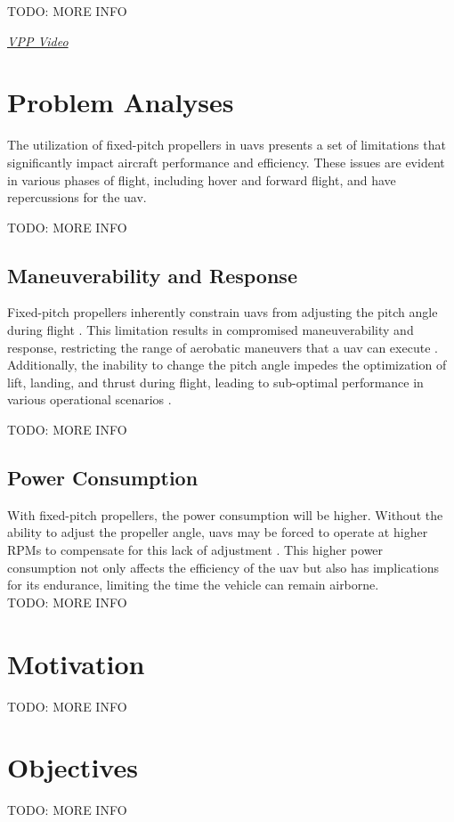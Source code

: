 TODO: MORE INFO

\href{https://www.youtube.com/watch?v=MpsBOQOUB-4}{\textit{VPP Video}}

\section{Problem Analyses}
The utilization of fixed-pitch propellers in \glspl{uav} presents a set of limitations that significantly impact aircraft performance and efficiency.
These issues are evident in various phases of flight, including hover and forward flight, and have repercussions for the \gls{uav}.

TODO: MORE INFO

\subsection{Maneuverability and Response}
Fixed-pitch propellers inherently constrain \glspl{uav} from adjusting the pitch angle during flight \cite{FPP1}. 
This limitation results in compromised maneuverability and response, restricting the range of aerobatic maneuvers that a \gls{uav} can execute \cite{FPP1}. 
Additionally, the inability to change the pitch angle impedes the optimization of lift, landing, and thrust during flight, leading to sub-optimal performance in various operational scenarios \cite{FPP1}.

TODO: MORE INFO

\subsection{Power Consumption}
With fixed-pitch propellers, the power consumption will be higher.
Without the ability to adjust the propeller angle, \glspl{uav} may be forced to operate at higher \gls{RPM}s to compensate for this lack of adjustment \cite{FPP1}.
This higher power consumption not only affects the efficiency of the \gls{uav} but also has implications for its endurance, limiting the time the vehicle can remain airborne.\\

TODO: MORE INFO

\section{Motivation}
TODO: MORE INFO

\section{Objectives}
TODO: MORE INFO